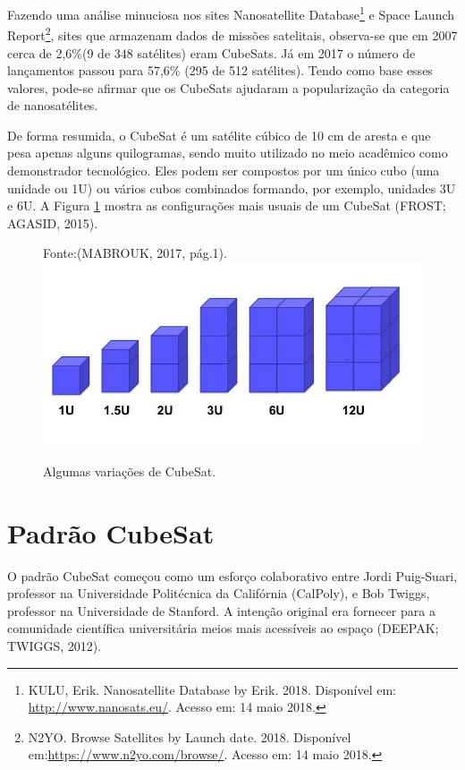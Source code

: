 Fazendo uma análise minuciosa nos sites Nanosatellite Database\footnote{ KULU, Erik. Nanosatellite Database by Erik. 2018. Disponível em: \url{http://www.nanosats.eu/}. Acesso em: 14 maio 2018.} e Space Launch Report\footnote{N2YO. Browse Satellites by Launch date. 2018. Disponível em:\url{https://www.n2yo.com/browse/}.  Acesso em: 14 maio 2018.}, sites que armazenam dados de missões satelitais, observa-se que em 2007 cerca de 2,6\%(9 de 348 satélites) eram CubeSats. Já em 2017 o número de lançamentos passou para 57,6\% (295 de 512 satélites). Tendo como base esses valores, pode-se afirmar que os CubeSats ajudaram a popularização da categoria de nanosatélites.

De forma resumida, o CubeSat é um satélite cúbico de 10 cm de aresta e que pesa apenas alguns quilogramas, sendo muito utilizado no meio acadêmico como demonstrador tecnológico. Eles podem ser compostos por um único cubo (uma unidade ou 1U) ou vários cubos combinados formando, por exemplo, unidades 3U e 6U. A Figura \ref{fig04} mostra as configurações mais usuais de um CubeSat (FROST; AGASID, 2015).


	\begin{figure}[h]
\footnotesize{
		\centering
		Fonte:(MABROUK, 2017, pág.1).
		\includegraphics[keepaspectratio=true,scale=0.58]{figuras/cubesatVariacoes.PNG}
		\caption{Algumas variações de CubeSat.}
		\label{fig04}
	}
	\end{figure}


\section{Padrão CubeSat}

O padrão CubeSat começou como um esforço colaborativo entre Jordi Puig-Suari, professor na Universidade Politécnica da Califórnia (CalPoly), e Bob Twiggs, professor na Universidade de Stanford. A intenção original era fornecer para a comunidade científica universitária meios mais acessíveis ao espaço (DEEPAK; TWIGGS, 2012).

